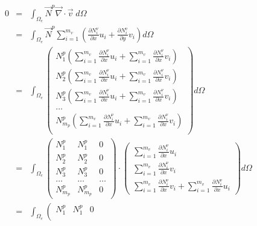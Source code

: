 \begin{eqnarray}
0&=&\int_{\Omega_e} \vec{N}^p {\vec \nabla}\cdot {\vec v} \; d\Omega \nonumber\\
&=& \int_{\Omega_e} \vec{N}^p \sum_{i=1}^{m_v} 
\left( \frac{\partial N_i^\upnu}{\partial x} u_i + \frac{\partial N_i^\upnu}{\partial y} v_i \right)  
d\Omega \nonumber\\
&=& 
\int_{\Omega_e} 
\left(
\begin{array}{c}
N_1^p \left(\sum\limits_{i=1}^{m_v} \frac{\partial N_i^\upnu }{\partial x} u_i +
\sum\limits_{i=1}^{m_v} \frac{\partial N_i^\upnu }{\partial x} v_i \right) \\
N_2^p \left(\sum\limits_{i=1}^{m_v} \frac{\partial N_i^\upnu }{\partial x} u_i +
\sum\limits_{i=1}^{m_v} \frac{\partial N_i^\upnu }{\partial x} v_i \right) \\
N_3^p \left(\sum\limits_{i=1}^{m_v} \frac{\partial N_i^\upnu }{\partial x} u_i +
\sum\limits_{i=1}^{m_v} \frac{\partial N_i^\upnu }{\partial x} v_i \right) \\
\dots \\
N_{m_p}^p \left(\sum\limits_{i=1}^{m_v} \frac{\partial N_i^\upnu }{\partial x} u_i +
\sum\limits_{i=1}^{m_v} \frac{\partial N_i^\upnu }{\partial x} v_i \right) \\
\end{array}
\right) d \Omega \nonumber \\  %
&=& 
\int_{\Omega_e} 
\left(
\begin{array}{ccc}
{N}_1^p & {N}_1^p & 0 \\
{N}_2^p & {N}_2^p & 0 \\
{N}_3^p & {N}_3^p & 0 \\
\dots & \dots & \dots \\
{N}_{m_p}^p & {N}_{m_p}^p & 0 
\end{array}
\right)
\cdot
\left(
\begin{array}{c}
\sum\limits_{i=1}^{m_v} \frac{\partial N_i^\upnu}{\partial x} u_i \\ 
\sum\limits_{i=1}^{m_v} \frac{\partial N_i^\upnu}{\partial x} v_i \\
\sum\limits_{i=1}^{m_v} \frac{\partial N_i^\upnu}{\partial x} v_i +
\sum\limits_{i=1}^{m_v} \frac{\partial N_i^\upnu}{\partial x} u_i 
\end{array}
\right) d\Omega \nonumber\\ %
&=& 
\int_{\Omega_e} 
\left(
\begin{array}{ccc}
{N}_1^p & {N}_1^p & 0 \\

\end{array}
\end{eqnarray}
